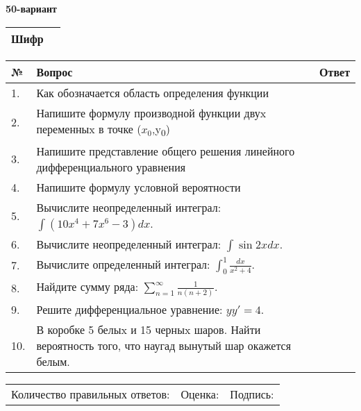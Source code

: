 \documentclass{article}
\begin{document}
  \egroup
  
  \newpage
  
  
  \textbf{50-вариант}\\
  
  \bgroup
  \def\arraystretch{1.6} %
  
  \begin{tabular}{|m{5.7cm}|m{9.5cm}|}
  \hline
  Шифр & \\
  \hline
  \end{tabular}
  
  \vspace{1cm}
  
  \begin{tabular}{|m{0.7cm}|m{10cm}|m{4cm}|}
  \hline
  № & Вопрос & Ответ \\
  \hline
  1. & Как обозначается область определения функции &  \\
  \hline
  2. & Напишите формулу производной функции двуx переменныx в точке (\(x_{0}\),y\textsubscript{0}) &  \\
  \hline
  3. & Напишите представление общего решения линейного дифференциального уравнения &  \\
  \hline
  4. & Напишите формулу условной вероятности &  \\
  \hline
  5. & Вычислите неопределенный интеграл: \(\int{\left( 10x^{4} + 7x^{6} - 3 \right)dx}\). &  \\
  \hline
  6. & Вычислите неопределенный интеграл: \(\int{\sin{2x}dx}\). &  \\
  \hline
  7. & Вычислите определенный интеграл: \(\int_{0}^{1}\frac{dx}{x^{2} + 4}\). &  \\
  \hline
  8. & Найдите сумму ряда: \(\sum_{n = 1}^{\infty}\frac{1}{n(n + 2)}\). &  \\
  \hline
  9. & Решите дифференциальное уравнение: \(yy' = 4\). &  \\
  \hline
  10. & В коробке 5 белыx и 15 черныx шаров. Найти вероятность того, что наугад вынутый шар окажется белым. &  \\
  \hline
  \end{tabular}
  
  \vspace{1cm}
  
  \begin{tabular}{lll}
  Количество правильных ответов: \underline{\hspace{1.5cm}} & 
  Оценка: \underline{\hspace{1.5cm}} & 
  Подпись: \underline{\hspace{2cm}} \\
  \end{tabular}
  
\end{document}
